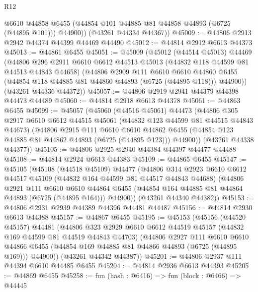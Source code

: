 \begin{lexlean}{R12}
\begin{coremodule}
          @6610
          @44858
          @6455
          (@44854 @101 @44885 @81 @44858 @44893 (@6725 (@44895 @101)))
          @44900))
      (@43261 @44334 @44367))
@45009 := @44806 @2913 @2942 @44374 @44399 @44469 @44490
@45012 := @44814 @2912 @6613 @44373
@45013 := @44861 @6455
@45051 := @45009
    (@45012
      (@44514 @45013)
      @44469
      (@44806
        @296
        @2911
        @6610
        @6612
        @44513
        @45013
        (@44832 @118 @44599 @81 @44513 @44843 @44658)
        (@44806
          @2909
          @111
          @6610
          @6610
          @44860
          @6455
          (@44854 @118 @44885 @81 @44860 @44893 (@6725 (@44895 @118)))
          @44900))
      (@43261 @44336 @44372))
@45057 := @44806 @2919 @2941 @44379 @44398 @44473 @44489
@45060 := @44814 @2918 @6613 @44378
@45061 := @44863 @6455
@45099 := @45057
    (@45060
      (@44516 @45061)
      @44473
      (@44806
        @305
        @2917
        @6610
        @6612
        @44515
        @45061
        (@44832 @123 @44599 @81 @44515 @44843 @44673)
        (@44806
          @2915
          @111
          @6610
          @6610
          @44862
          @6455
          (@44854 @123 @44885 @81 @44862 @44893 (@6725 (@44895 @123)))
          @44900))
      (@43261 @44338 @44377))
@45105 := @44806 @2925 @2940 @44384 @44397 @44477 @44488
@45108 := @44814 @2924 @6613 @44383
@45109 := @44865 @6455
@45147 := @45105
    (@45108
      (@44518 @45109)
      @44477
      (@44806
        @314
        @2923
        @6610
        @6612
        @44517
        @45109
        (@44832 @164 @44599 @81 @44517 @44843 @44688)
        (@44806
          @2921
          @111
          @6610
          @6610
          @44864
          @6455
          (@44854 @164 @44885 @81 @44864 @44893 (@6725 (@44895 @164)))
          @44900))
      (@43261 @44340 @44382))
@45153 := @44806 @2931 @2939 @44389 @44396 @44481 @44487
@45156 := @44814 @2930 @6613 @44388
@45157 := @44867 @6455
@45195 := @45153
    (@45156
      (@44520 @45157)
      @44481
      (@44806
        @323
        @2929
        @6610
        @6612
        @44519
        @45157
        (@44832 @169 @44599 @81 @44519 @44843 @44703)
        (@44806
          @2927
          @111
          @6610
          @6610
          @44866
          @6455
          (@44854 @169 @44885 @81 @44866 @44893 (@6725 (@44895 @169)))
          @44900))
      (@43261 @44342 @44387))
@45201 := @44806 @2937 @111 @44394 @6610 @44485 @6455
@45204 := @44814 @2936 @6613 @44393
@45205 := @44869 @6455
@45258 := fun (hash : @6416) =>
  fun (block : @6466) =>
  @44445

\end{coremodule}
\end{lexlean}
